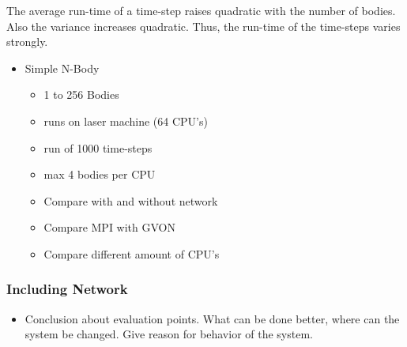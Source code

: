 The average run-time of a time-step raises quadratic with the number
of bodies. Also the variance increases quadratic. Thus, the run-time
of the time-steps varies strongly.



\begin{itemize}
  \item Simple N-Body
    \begin{itemize}
    \item 1 to 256 Bodies
    \item runs on laser machine (64 CPU's)
    \item run of 1000 time-steps
    \item max 4 bodies per CPU
    \item Compare with and without network
    \item Compare MPI with GVON
    \item Compare different amount of CPU's
    \end{itemize}
\end{itemize}

\subsubsection*{Including Network}


\begin{itemize}
\item Conclusion about evaluation points. What can
  be done better, where can the system be changed.
  Give reason for behavior of the system.

\end{itemize}

\cleardoublepage

